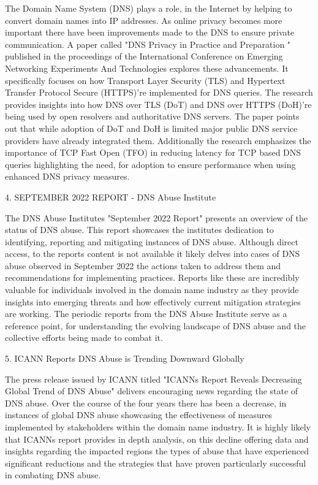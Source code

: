 The Domain Name System (DNS) plays a role, in the Internet by helping to convert domain names into IP addresses. As online privacy becomes more important there have been improvements made to the DNS to ensure private communication. A paper called "DNS Privacy in Practice and Preparation " published in the proceedings of the International Conference on Emerging Networking Experiments And Technologies explores these advancements. It specifically focuses on how Transport Layer Security (TLS) and Hypertext Transfer Protocol Secure (HTTPS)'re implemented for DNS queries. The research provides insights into how DNS over TLS (DoT) and DNS over HTTPS (DoH)'re being used by open resolvers and authoritative DNS servers. The paper points out that while adoption of DoT and DoH is limited major public DNS service providers have already integrated them. \cite{acm2023dnsprivacy} Additionally the research emphasizes the importance of TCP Fast Open (TFO) in reducing latency for TCP based DNS queries highlighting the need, for adoption to ensure performance when using enhanced DNS privacy measures.


4. SEPTEMBER 2022 REPORT - DNS Abuse Institute

The DNS Abuse Institutes "September 2022 Report" presents an overview of the status of DNS abuse. This report showcases the institutes dedication to identifying, reporting and mitigating instances of DNS abuse. Although direct access, to the reports content is not available it likely delves into cases of DNS abuse observed in September 2022 the actions taken to address them and recommendations for implementing practices. Reports like these are incredibly valuable for individuals involved in the domain name industry as they provide insights into emerging threats and how effectively current mitigation strategies are working.\cite{dnsai2022report} The periodic reports from the DNS Abuse Institute serve as a reference point, for understanding the evolving landscape of DNS abuse and the collective efforts being made to combat it.


5. ICANN Reports DNS Abuse is Trending Downward Globally

The press release issued by ICANN titled "ICANNs Report Reveals Decreasing Global Trend of DNS Abuse" delivers encouraging news regarding the state of DNS abuse. Over the course of the four years there has been a decrease, in instances of global DNS abuse showcasing the effectiveness of measures implemented by stakeholders within the domain name industry.\cite{icann2022dnsabuse} It is highly likely that ICANNs report provides in depth analysis, on this decline offering data and insights regarding the impacted regions the types of abuse that have experienced significant reductions and the strategies that have proven particularly successful in combating DNS abuse.



